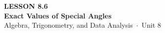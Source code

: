 \documentclass[aspectratio=169, 11pt]{beamer}
\begin{document}
{
\begin{frame}[plain]
  \vspace{2.8cm}\hspace{0.55cm}%
  \begin{minipage}{0.9\textwidth}
    {\color{goldacc}\bfseries\small LESSON 8.6}\\[0.5cm]
    {\color{white}\bfseries\LARGE Exact Values of Special Angles}\\[1.2cm]
    {\color{mistmid}\small Algebra, Trigonometry, and Data Analysis~$\cdot$~Unit 8}
  \end{minipage}
\end{frame}
}

\begin{frame}[t, plain]
\end{frame}
\end{document}
